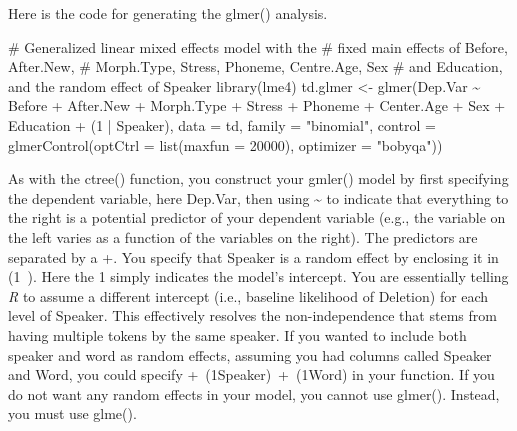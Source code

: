 \documentclass[
  10pt,
  letterpaper]{article}
\newenvironment{Shaded}{\begin{snugshade}}{\end{snugshade}}
\newcommand{\AttributeTok}[1]{\textcolor[rgb]{0.40,0.45,0.13}{#1}}
\newcommand{\CommentTok}[1]{\textcolor[rgb]{0.37,0.37,0.37}{#1}}
\newcommand{\DecValTok}[1]{\textcolor[rgb]{0.68,0.00,0.00}{#1}}
\newcommand{\FunctionTok}[1]{\textcolor[rgb]{0.28,0.35,0.67}{#1}}
\newcommand{\NormalTok}[1]{\textcolor[rgb]{0.00,0.23,0.31}{#1}}
\newcommand{\OtherTok}[1]{\textcolor[rgb]{0.00,0.23,0.31}{#1}}
\newcommand{\SpecialCharTok}[1]{\textcolor[rgb]{0.37,0.37,0.37}{#1}}
\newcommand{\StringTok}[1]{\textcolor[rgb]{0.13,0.47,0.30}{#1}}
\renewcommand\texttt[1]{{\ttfamily\color{BrickRed}#1}}
\begin{document}
Here is the code for generating the \texttt{glmer()} analysis.

\begin{Shaded}
\begin{Highlighting}[]
\CommentTok{\# Generalized linear mixed effects model with the}
\CommentTok{\# fixed main effects of Before, After.New,}
\CommentTok{\# Morph.Type, Stress, Phoneme, Centre.Age, Sex}
\CommentTok{\# and Education, and the random effect of Speaker}
\FunctionTok{library}\NormalTok{(lme4)}
\NormalTok{td.glmer }\OtherTok{\textless{}{-}} \FunctionTok{glmer}\NormalTok{(Dep.Var }\SpecialCharTok{\textasciitilde{}}\NormalTok{ Before }\SpecialCharTok{+}\NormalTok{ After.New }\SpecialCharTok{+}\NormalTok{ Morph.Type }\SpecialCharTok{+}
\NormalTok{    Stress }\SpecialCharTok{+}\NormalTok{ Phoneme }\SpecialCharTok{+}\NormalTok{ Center.Age }\SpecialCharTok{+}\NormalTok{ Sex }\SpecialCharTok{+}\NormalTok{ Education }\SpecialCharTok{+}
\NormalTok{    (}\DecValTok{1} \SpecialCharTok{|}\NormalTok{ Speaker), }\AttributeTok{data =}\NormalTok{ td, }\AttributeTok{family =} \StringTok{"binomial"}\NormalTok{,}
    \AttributeTok{control =} \FunctionTok{glmerControl}\NormalTok{(}\AttributeTok{optCtrl =} \FunctionTok{list}\NormalTok{(}\AttributeTok{maxfun =} \DecValTok{20000}\NormalTok{),}
        \AttributeTok{optimizer =} \StringTok{"bobyqa"}\NormalTok{))}
\end{Highlighting}
\end{Shaded}

As with the \texttt{ctree()} function, you construct your
\texttt{gmler()} model by first specifying the dependent variable, here
\texttt{Dep.Var}, then using \texttt{\textasciitilde{}} to indicate that
everything to the right is a potential predictor of your dependent
variable (e.g., the variable on the left varies as a function of the
variables on the right). The predictors are separated by a \texttt{+}.
You specify that \texttt{Speaker} is a random effect by enclosing it in
\texttt{(1\textbar{}\ )}. Here the \texttt{1} simply indicates the
model's intercept. You are essentially telling \emph{R} to assume a
different intercept (i.e., baseline likelihood of \texttt{Deletion}) for
each level of \texttt{Speaker}. This effectively resolves the
non-independence that stems from having multiple tokens by the same
speaker. If you wanted to include both speaker and word as random
effects, assuming you had columns called \texttt{Speaker} and
\texttt{Word}, you could specify
\texttt{+\ (1\textbar{}Speaker)\ +\ (1\textbar{}Word)} in your function.
If you do not want any random effects in your model, you cannot use
\texttt{glmer()}. Instead, you must use \texttt{glme()}.
\end{document}

